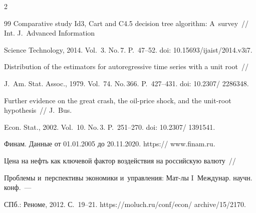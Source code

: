 \begin{multicols}{2}
{{\begin{thebibliography}{99}
Comparative study Id3, Cart and C4.5 decision tree algorithm: A~survey~// Int. J.~Advanced Information 

Science Technology, 2014. Vol.~3. No.\,7. P.~47--52. doi: 10.15693/ijaist/2014.v3i7.













Distribution of the estimators for autoregressive time series with a unit root~// 

J.~Am. Stat. Assoc., 1979. Vol.~74. No.\,366. P.~427--431. doi: 10.2307/ 2286348.





Further evidence on the great crash, the oil-price shock, and the unit-root hypothesis~// J.~Bus. 

Econ. Stat., 2002. Vol.~10. No.\,3. P.~251--270. doi: 10.2307/ 1391541.




Финам. Данные от 01.01.2005 до 20.11.2020. {\sf https:// www.finam.ru}.




 Цена на нефть как ключевой фактор воздействия на российскую валюту~// 

Проб\-ле\-мы и~перспективы экономики и~управ\-ле\-ния: Мат-лы I~Междунар. на\-учн. конф.~--- 

СПб.: Реноме, 2012. С.~19--21. {\sf  https://moluch.ru/conf/econ/ archive/15/2170}.

\end{thebibliography}



 }

 }



\end{multicols}




